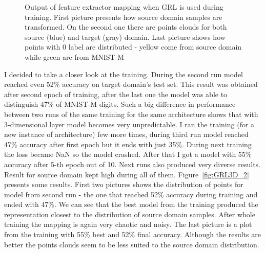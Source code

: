 \documentclass{article}
\begin{document}
\begin{figure}[htb]%
\captionsetup[subfigure]{labelformat=empty}
    \centering
    \qquad
    \qquad
    \caption{Output of feature extractor mapping when GRL is used during training. First picture presents how source domain samples are transformed. On the second one there are points clouds for both source (blue) and target (gray) domain. Last picture shows how points with 0 label are distributed - yellow come from source domain while green are from MNIST-M}%
    \label{fig:GRL3D}%
\end{figure}
I decided to take a closer look at the training. During the second run model reached even 52\% accuracy on target domain's test set. This result was obtained after second epoch of training, after the last one the model was able to distinguish 47\% of MNIST-M digits. Such a big difference in performance between two runs of the same training for the same architecture shows that with 3-dimensional layer model becomes very unpredictable. I ran the training (for a new instance of architecture) few more times, during third run model reached 47\% accuracy after first epoch but it ends with just 35\%. During next training the loss became NaN so the model crashed. After that I got a model with 55\% accuracy after 5-th epoch out of 10. Next runs also produced very diverse results. Result for source domain kept high during all of them. Figure~\ref{fig:GRL3D_2} presents some results. First two pictures shows the distribution of points for model from second run - the one that reached 52\% accuracy during training and ended with 47\%. We can see that the best model from the training produced the representation closest to the distribution of source domain samples. After whole training the mapping is again very chaotic and noisy. The last picture is a plot from the training with 55\% best and 52\% final accuracy. Although the results are better the points clouds seem to be less suited to the source domain distribution. 
\end{document}
